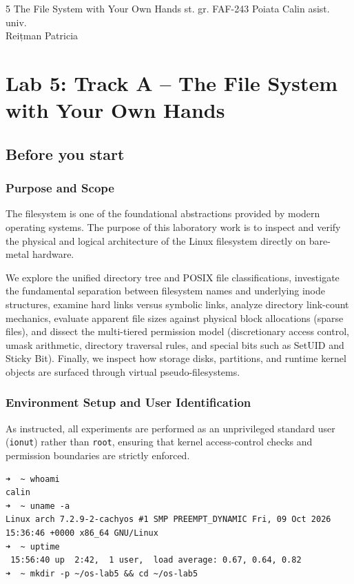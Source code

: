 \documentclass{labreport}
\begin{document}
\labtitle
    {5}
    {The File System with Your Own Hands}
    {st. gr. FAF-243}
    {Poiata Calin}
    {asist. univ.\\[0.15cm] Reițman Patricia}

\tableofcontents
\newpage

\section{Lab 5: Track A -- The File System with Your Own Hands}

\subsection{Before you start}

\subsubsection*{Purpose and Scope}
The filesystem is one of the foundational abstractions provided by modern operating systems. The purpose of this laboratory work is to inspect and verify the physical and logical architecture of the Linux filesystem directly on bare-metal hardware. 

We explore the unified directory tree and POSIX file classifications, investigate the fundamental separation between filesystem names and underlying inode structures, examine hard links versus symbolic links, analyze directory link-count mechanics, evaluate apparent file sizes against physical block allocations (sparse files), and dissect the multi-tiered permission model (discretionary access control, umask arithmetic, directory traversal rules, and special bits such as SetUID and Sticky Bit). Finally, we inspect how storage disks, partitions, and runtime kernel objects are surfaced through virtual pseudo-filesystems.

\subsubsection*{Environment Setup and User Identification}
As instructed, all experiments are performed as an unprivileged standard user (\texttt{ionut}) rather than \texttt{root}, ensuring that kernel access-control checks and permission boundaries are strictly enforced.

\begin{lstlisting}[style=bash]
➜  ~ whoami
calin
➜  ~ uname -a
Linux arch 7.2.9-2-cachyos #1 SMP PREEMPT_DYNAMIC Fri, 09 Oct 2026 15:36:46 +0000 x86_64 GNU/Linux
➜  ~ uptime
 15:56:40 up  2:42,  1 user,  load average: 0.67, 0.64, 0.82
➜  ~ mkdir -p ~/os-lab5 && cd ~/os-lab5
\end{lstlisting}
\end{document}
